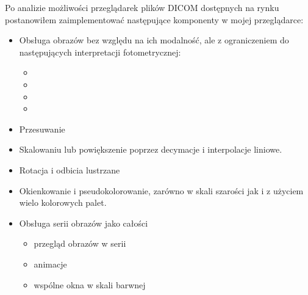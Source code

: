 
\par
Po analizie możliwości przeglądarek plików DICOM dostępnych na rynku postanowiłem zaimplementować następujące komponenty w mojej przeglądarce:
\begin{itemize}
    \item Obsługa obrazów bez względu na ich modalność, ale z ograniczeniem do następujących interpretacji fotometrycznej:

          \begin{itemize}
              \item {}
              \item {}
              \item {}
              \item {}
          \end{itemize}

    \item Przesuwanie 

    \item Skalowaniu lub powiększenie poprzez decymacje i interpolacje liniowe.

    \item Rotacja i odbicia lustrzane

    \item Okienkowanie i pseudokolorowanie, zarówno w skali szarości jak i z użyciem wielo kolorowych palet.

    \item Obsługa serii obrazów jako całości
          \begin{itemize}
              \item przegląd obrazów w serii
              \item animacje
              \item wspólne okna w skali barwnej
          \end{itemize}
\end{itemize}
